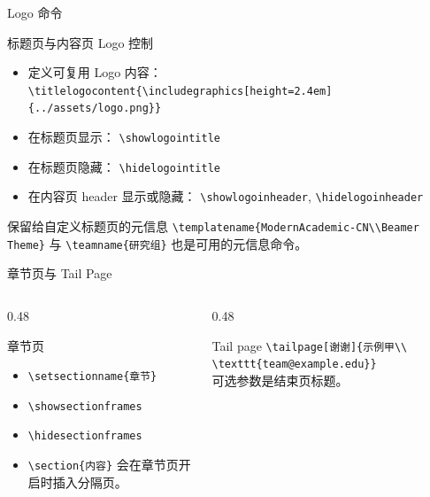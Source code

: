 \documentclass[aspectratio=169,10pt]{ctexbeamer}
\begin{document}
\begin{academicframe}{Logo 命令}
  \begin{block}{标题页与内容页 Logo 控制}
    \scriptsize
    \begin{itemize}
      \item 定义可复用 Logo 内容：
        \texttt{\textbackslash titlelogocontent\{\textbackslash includegraphics[height=2.4em]\{../assets/logo.png\}\}}
      \item 在标题页显示：
        \texttt{\textbackslash showlogointitle}
      \item 在标题页隐藏：
        \texttt{\textbackslash hidelogointitle}
      \item 在内容页 header 显示或隐藏：
        \texttt{\textbackslash showlogoinheader},
        \texttt{\textbackslash hidelogoinheader}
    \end{itemize}
  \end{block}

  \vspace{0.35em}
  \begin{exampleblock}{保留给自定义标题页的元信息}
    \scriptsize
    \texttt{\textbackslash templatename\{ModernAcademic-CN\textbackslash\textbackslash Beamer Theme\}}
    与 \texttt{\textbackslash teamname\{研究组\}} 也是可用的元信息命令。
  \end{exampleblock}
\end{academicframe}

\begin{academicframe}[自动章节页与结束页]{章节页与 Tail Page}
  \begin{columns}[T,onlytextwidth]
    \begin{column}{0.48\textwidth}
      \begin{block}{章节页}
        \scriptsize
        \begin{itemize}
          \item \texttt{\textbackslash setsectionname\{章节\}}
          \item \texttt{\textbackslash showsectionframes}
          \item \texttt{\textbackslash hidesectionframes}
          \item \texttt{\textbackslash section\{内容\}} 会在章节页开启时插入分隔页。
        \end{itemize}
      \end{block}
    \end{column}
    \begin{column}{0.48\textwidth}
      \begin{exampleblock}{Tail page}
        \scriptsize
        \texttt{\textbackslash tailpage[谢谢]\{示例甲\textbackslash\textbackslash
        \textbackslash texttt\{team@example.edu\}\}}\\[0.7em]
        可选参数是结束页标题。
      \end{exampleblock}
    \end{column}
  \end{columns}
\end{academicframe}
\end{document}
